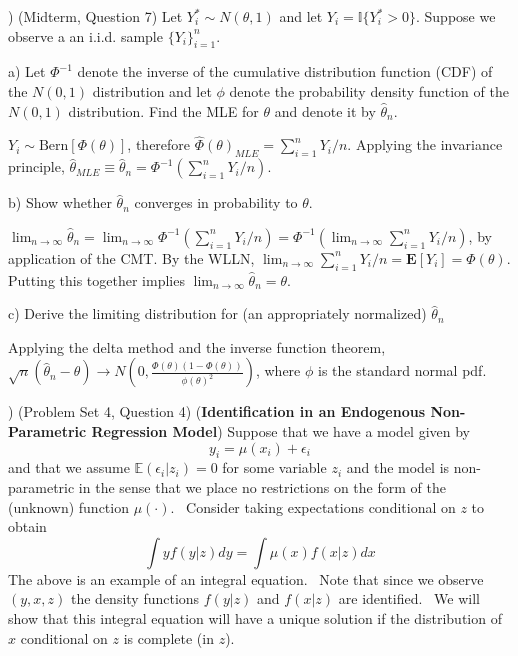 \documentclass[12pt,english]{article}
\begin{document}
\vspace{1em}
) (Midterm, Question 7) Let $Y_{i}^{*}\sim N(\theta,1)$ and let
$Y_{i}=\mathbb{I}\{Y_{i}^{*}>0\}$. Suppose we observe a an i.i.d. sample
$\{Y_{i}\}_{i=1}^{n}$.

a) Let $\Phi^{-1}$ denote the inverse of the cumulative
distribution function (CDF) of the $N(0,1)$ distribution and
let $\phi$ denote the probability density function of the
$N(0,1)$ distribution. Find
the MLE for $\theta$ and denote it by $\hat{\theta}_{n}$.  
\vspace{1em}

$Y_{i} \sim \text{Bern}[\Phi(\theta)]$, therefore $\hat{\Phi}(\theta)_{MLE} = \sum_{i=1}^{n} Y_{i} / n$. Applying the invariance principle, $\hat{\theta}_{MLE} \equiv \hat{\theta}_{n} = \Phi^{-1}(\sum_{i=1}^{n} Y_{i} / n)$.

\vspace{1em}
b) Show whether $\hat{\theta}_{n}$ converges in probability to  $\theta$. 
\vspace{1em}

$\lim_{n \to \infty} \hat{\theta}_{n} = \lim_{n \to \infty} \Phi^{-1}(\sum_{i=1}^{n} Y_{i} / n) = \Phi^{-1}( \lim_{n \to \infty} \sum_{i=1}^{n} Y_{i} / n)$, by application of the CMT. By the WLLN, $\lim_{n \to \infty} \sum_{i=1}^{n} Y_{i} / n = \mathbf{E}[Y_{i}] = \Phi(\theta)$. Putting this together implies $\lim_{n \to \infty} \hat{\theta}_{n} = \theta$.

\vspace{1em}
c) Derive the limiting distribution for (an appropriately
normalized) $\hat{\theta}_{n}$
\vspace{1em}

Applying the delta method and the inverse function theorem, \\ $\sqrt{n} \left( \hat{\theta}_{n} - \theta \right) \to N \left(0, \frac{\Phi(\theta)(1 - \Phi(\theta))}{\phi(\theta)^{2}} \right)$, where $\phi$ is the standard normal pdf.

\vspace{1em}
) (Problem Set 4, Question 4) (\textbf{Identification in an Endogenous Non-Parametric Regression Model})  Suppose that we have a model given by%
\begin{equation*}
y_{i}=\mu \left( x_{i}\right) +\epsilon _{i}
\end{equation*}%
and that we assume $\mathbb{E}\left( \epsilon _{i}|z_{i}\right) =0$
for some variable $z_{i}$ and the model is non-parametric in the sense
that we place no restrictions on the form of the (unknown) function $\mu
\left( \cdot \right) .$ \ Consider taking expectations conditional on
$z$ to obtain%
\begin{equation*}
\int yf\left( y|z\right) dy=\int \mu \left( x\right) f\left( x|z\right) dx
\end{equation*}%
The above is an example of an integral equation. \ Note that since we
observe $\left( y,x,z\right) $ the density functions $f\left( y|z\right) $
and $f\left( x|z\right) $ are identified. \ We will show that this integral
equation will have a unique solution if the distribution of $x$ conditional
on $z$ is complete (in $z$). 
\end{document}
